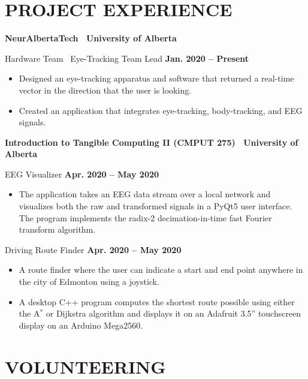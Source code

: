\documentclass{article}
\begin{document}
\section*{\textcolor{my_colour}{PROJECT EXPERIENCE}}
\vspace{-.25em} \hrulefill \vspace{.75em}

    \textbf{NeurAlbertaTech \textbar\ University of Alberta}

    Hardware Team \textbar\ Eye-Tracking Team Lead \hfill \textbf{Jan. 2020 -- Present}
    \begin{itemize}
        \item Designed an eye-tracking apparatus and software that returned a real-time vector in the direction that the user is looking.
        \item Created an application that integrates eye-tracking, body-tracking, and EEG signals.
    \end{itemize}

    \textbf{Introduction to Tangible Computing II (CMPUT 275) \textbar\ University of Alberta}

    EEG Visualizer \hfill \textbf{Apr. 2020 -- May 2020}
    \begin{itemize}
        \item The application takes an EEG data stream over a local network and visualizes both the raw and transformed signals in a PyQt5 user interface. The program implements the radix-2 decimation-in-time fast Fourier transform algorithm.
    \end{itemize}

    Driving Route Finder \hfill \textbf{Apr. 2020 -- May 2020}
    \begin{itemize}
        \item A route finder where the user can indicate a start and end point anywhere in the city of Edmonton using a joystick.
        \item A desktop C++ program computes the shortest route possible using either the A$^*$ or Dijkstra algorithm and displays it on an Adafruit 3.5'' touchscreen display on an Arduino Mega2560.
    \end{itemize}


\section*{\textcolor{my_colour}{VOLUNTEERING}}
\vspace{-.25em} \hrulefill \vspace{.75em}
\end{document}
